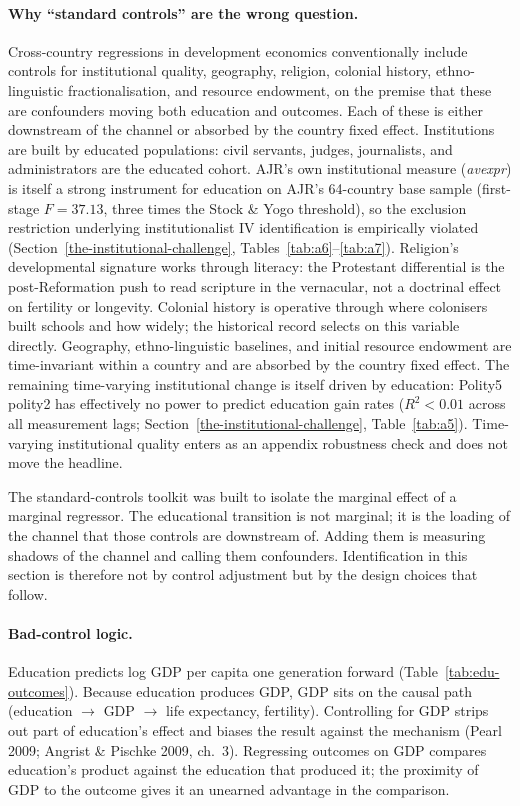 \documentclass[12pt,letterpaper]{article}
\begin{document}
\paragraph{Why ``standard controls'' are the wrong question.}
Cross-country regressions in development economics conventionally
include controls for institutional quality, geography, religion,
colonial history, ethno-linguistic fractionalisation, and resource
endowment, on the premise that these are confounders moving both
education and outcomes. Each of these is either downstream of the
channel or absorbed by the country fixed effect. Institutions are
built by educated populations: civil servants, judges, journalists,
and administrators are the educated cohort. AJR's own institutional
measure (\emph{avexpr}) is itself a strong instrument for education on
AJR's 64-country base sample (first-stage $F=37.13$, three times the
Stock \& Yogo threshold), so the exclusion restriction underlying
institutionalist IV identification is empirically violated
(Section~\ref{the-institutional-challenge}, Tables~\ref{tab:a6}--\ref{tab:a7}).
Religion's developmental signature works through literacy: the
Protestant differential is the post-Reformation push to read scripture
in the vernacular, not a doctrinal effect on fertility or longevity.
Colonial history is operative through where colonisers built schools
and how widely; the historical record selects on this variable
directly. Geography, ethno-linguistic baselines, and initial resource
endowment are time-invariant within a country and are absorbed by the
country fixed effect. The remaining time-varying institutional change
is itself driven by education: Polity5 polity2 has effectively no
power to predict education gain rates
($R^2 < 0.01$ across all measurement lags;
Section~\ref{the-institutional-challenge}, Table~\ref{tab:a5}).
Time-varying institutional quality enters as an appendix robustness
check and does not move the headline.

The standard-controls toolkit was built to isolate the marginal effect
of a marginal regressor. The educational transition is not marginal;
it is the loading of the channel that those controls are downstream
of. Adding them is measuring shadows of the channel and calling them
confounders. Identification in this section is therefore not by
control adjustment but by the design choices that follow.

\paragraph{Bad-control logic.}
Education predicts log GDP per capita one generation forward
(Table~\ref{tab:edu-outcomes}). Because education produces GDP, GDP sits on the
causal path (education $\to$ GDP $\to$ life expectancy, fertility).
Controlling for GDP strips out part of education's effect and biases
the result against the mechanism (Pearl 2009; Angrist \& Pischke 2009,
ch.~3). Regressing outcomes on GDP compares education's product
against the education that produced it; the proximity of GDP to the
outcome gives it an unearned advantage in the comparison.
\end{document}
